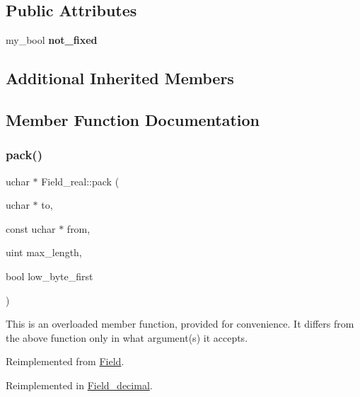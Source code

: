 \subsection*{Public Attributes}
\begin{DoxyCompactItemize}
\item 
\mbox{\label{classField__real_a17bb9dff64e280d9b686fd700b77d0fd}} 
my\+\_\+bool {\bfseries not\+\_\+fixed}
\end{DoxyCompactItemize}
\subsection*{Additional Inherited Members}


\subsection{Member Function Documentation}
\mbox{\label{classField__real_a350715a27630782dd1247287d2446480}} 
\subsubsection{\texorpdfstring{pack()}{pack()}}
{\footnotesize\ttfamily uchar $\ast$ Field\+\_\+real\+::pack (\begin{DoxyParamCaption}\item[{uchar $\ast$}]{to,  }\item[{const uchar $\ast$}]{from,  }\item[{uint}]{max\+\_\+length,  }\item[{bool}]{low\+\_\+byte\+\_\+first }\end{DoxyParamCaption})\hspace{0.3cm}{\ttfamily [virtual]}}

This is an overloaded member function, provided for convenience. It differs from the above function only in what argument(s) it accepts.

Reimplemented from \mbox{\hyperlink{classField_a9eaff8d3425ef0e1da69b32cbd8f2879}{Field}}.



Reimplemented in \mbox{\hyperlink{classField__decimal_a85c1f4498b4f8f773056efcf6c3a901a}{Field\+\_\+decimal}}.

\mbox{\label{classField__real_ae06ebf885e6b10b0a7c4966873d6b80f}} 
